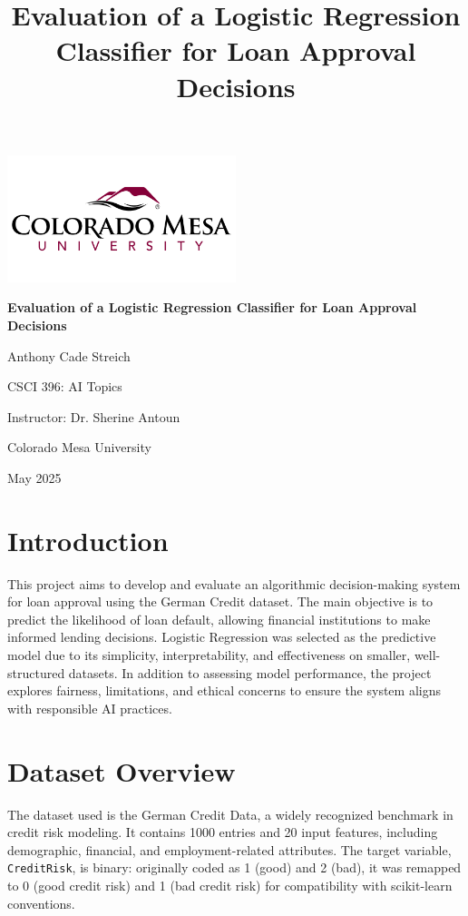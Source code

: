 \documentclass[12pt]{article}
\title{Evaluation of a Logistic Regression Classifier for Loan Approval Decisions}
\author{}
\date{}
\begin{document}
	
	\begin{titlepage}
	\centering
	\vspace*{2cm}
	
	\includegraphics[width=0.5\textwidth]{CMU Logo} %
	\vspace{1cm}
	
	{\Huge \bfseries Evaluation of a Logistic Regression Classifier for Loan Approval Decisions \par}
	\vspace{1.5cm}
	
	{\Large Anthony Cade Streich \par}
	\vspace{0.5cm}
	
	CSCI 396: AI Topics \par
	Instructor: Dr. Sherine Antoun \par
	Colorado Mesa University \par
	\vfill
	
	{\large May 2025 \par}
\end{titlepage}
	
	\section{Introduction}
	This project aims to develop and evaluate an algorithmic decision-making system for loan approval using the German Credit dataset. The main objective is to predict the likelihood of loan default, allowing financial institutions to make informed lending decisions. Logistic Regression was selected as the predictive model due to its simplicity, interpretability, and effectiveness on smaller, well-structured datasets. In addition to assessing model performance, the project explores fairness, limitations, and ethical concerns to ensure the system aligns with responsible AI practices.
	
	\section{Dataset Overview}
	The dataset used is the German Credit Data, a widely recognized benchmark in credit risk modeling. It contains 1000 entries and 20 input features, including demographic, financial, and employment-related attributes. The target variable, \texttt{CreditRisk}, is binary: originally coded as 1 (good) and 2 (bad), it was remapped to 0 (good credit risk) and 1 (bad credit risk) for compatibility with scikit-learn conventions.
	
\end{document}
